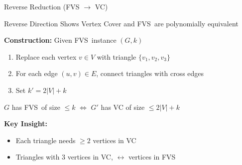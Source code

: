 \documentclass[aspectratio=169]{beamer}
\newcommand{\fvs}{\textsc{FVS}}
\begin{document}
\begin{frame}{Reverse Reduction (FVS $\rightarrow$ VC)}
	\begin{block}{Reverse Direction}
		Shows Vertex Cover and \fvs\ are polynomially equivalent
	\end{block}

	\vspace{0.3cm}

	\textbf{Construction:} Given \fvs\ instance $(G,k)$
	\begin{enumerate}
		\item Replace each vertex $v \in V$ with triangle $\{v_1, v_2, v_3\}$
		\item For each edge $(u,v) \in E$, connect triangles with cross edges
		\item Set $k' = 2|V| + k$
	\end{enumerate}

	\vspace{0.3cm}

	\begin{theorem}
		$G$ has \fvs\ of size $\leq k$ $\Leftrightarrow$ $G'$ has VC of size $\leq 2|V| + k$
	\end{theorem}

	\textbf{Key Insight:}
	\begin{itemize}
		\item Each triangle needs $\geq 2$ vertices in VC
		\item Triangles with 3 vertices in VC, $\leftrightarrow$ vertices in \fvs
	\end{itemize}
\end{frame}
\end{document}
